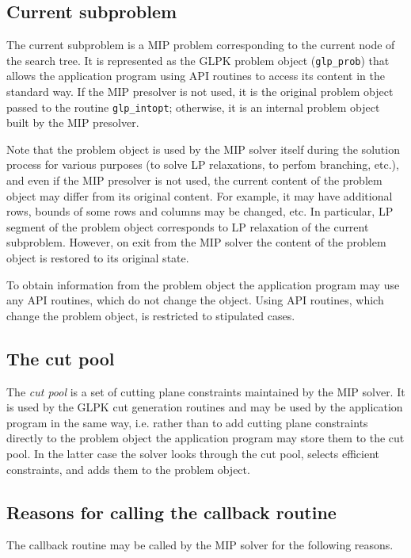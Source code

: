 \subsection{Current subproblem}

The current subproblem is a MIP problem corresponding to the current
node of the search tree. It is represented as the GLPK problem object
(\verb|glp_prob|) that allows the application program using API routines
to access its content in the standard way. If the MIP presolver is not
used, it is the original problem object passed to the routine
\verb|glp_intopt|; otherwise, it is an internal problem object built by
the MIP presolver.

Note that the problem object is used by the MIP solver itself during
the solution process for various purposes (to solve LP relaxations, to
perfom branching, etc.), and even if the MIP presolver is not used, the
current content of the problem object may differ from its original
content. For example, it may have additional rows, bounds of some rows
and columns may be changed, etc. In particular, LP segment of the
problem object corresponds to LP relaxation of the current subproblem.
However, on exit from the MIP solver the content of the problem object
is restored to its original state.

To obtain information from the problem object the application program
may use any API routines, which do not change the object. Using API
routines, which change the problem object, is restricted to stipulated
cases.

\subsection{The cut pool}

The {\it cut pool} is a set of cutting plane constraints maintained by
the MIP solver. It is used by the GLPK cut generation routines and may
be used by the application program in the same way, i.e. rather than
to add cutting plane constraints directly to the problem object the
application program may store them to the cut pool. In the latter case
the solver looks through the cut pool, selects efficient constraints,
and adds them to the problem object.

\subsection{Reasons for calling the callback routine}

The callback routine may be called by the MIP solver for the following
reasons.

